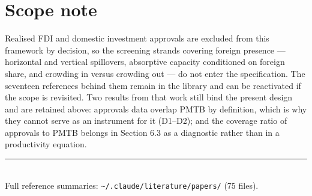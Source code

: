 \documentclass[11pt,a4paper]{article}
\begin{document}
\section{Scope note}

Realised FDI and domestic investment approvals are excluded from this framework by decision, so
the screening strands covering foreign presence --- horizontal and vertical spillovers,
absorptive capacity conditioned on foreign share, and crowding in versus crowding out --- do not
enter the specification. The seventeen references behind them remain in the library and can be
reactivated if the scope is revisited. Two results from that work still bind the present design
and are retained above: approvals data overlap PMTB by definition, which is why they cannot serve
as an instrument for it (D1--D2); and the coverage ratio of approvals to PMTB belongs in
Section 6.3 as a diagnostic rather than in a productivity equation.

\vfill
\noindent\rule{\textwidth}{0.4pt}\\
{\footnotesize\textcolor{abu}{Full reference summaries: \texttt{\textasciitilde/.claude/literature/papers/}
(75 files).}}
\end{document}
